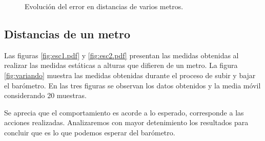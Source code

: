 \documentclass[spanish,12pt,a4paper,titlepage]{report}
\begin{document}
\begin{figure}[H]
\hspace{-50pt}
  \caption{Evolución del error en distancias de varios metros.}
\label{fig:autocorr}
\end{figure}

\newpage
\subsection{Distancias de un metro}

Las figuras \ref{fig:esc1.pdf} y \ref{fig:esc2.pdf} presentan las medidas obtenidas al realizar las medidas estáticas a alturas que difieren de un metro. La figura \ref{fig:variando} muestra las medidas obtenidas durante el proceso de subir y bajar el barómetro. En las tres figuras se observan los datos obtenidos y la media móvil considerando 20 muestras.

Se aprecia que el comportamiento es acorde a lo esperado, corresponde a las acciones realizadas. Analizaremos con mayor detenimiento los resultados para concluir que es lo que podemos esperar del barómetro.
\end{document}
